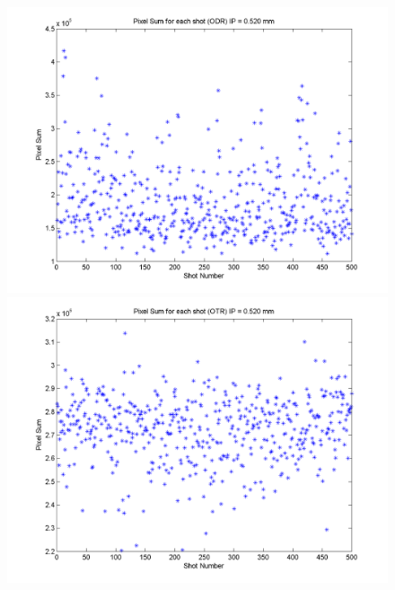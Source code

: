 \documentclass[12pt]{article}
\begin{document}
\begin{figure}
\begin{center}
\includegraphics[scale=0.5]{Figures/PixelSum_ODR_520.PNG}
\includegraphics[scale=0.5]{Figures/PixelSum_OTR_520.PNG}
\caption{}
\end{center}
\end{figure}
\end{document}
